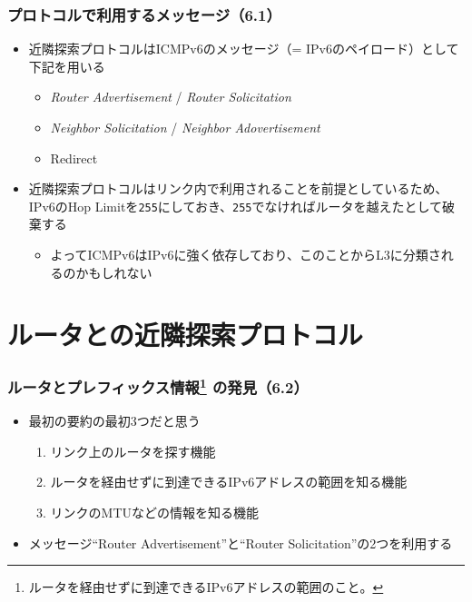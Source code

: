 \begin{frame}
  \frametitle{プロトコルで利用するメッセージ（6.1）}

  \begin{itemize}
    \item 近隣探索プロトコルはICMPv6のメッセージ（= IPv6のペイロード）として下記を用いる
    \begin{itemize}
      \item \emph{Router Advertisement} / \emph{Router Solicitation}
      \item \emph{Neighbor Solicitation} / \emph{Neighbor Adovertisement}
      \item Redirect
    \end{itemize}

    \item 近隣探索プロトコルはリンク内で利用されることを前提としているため、
    IPv6のHop Limitを\texttt{255}にしておき、\texttt{255}でなければルータを越えたとして破棄する
    \begin{itemize}
      \item よってICMPv6はIPv6に強く依存しており、このことからL3に分類されるのかもしれない
    \end{itemize}
  \end{itemize}
\end{frame}

\section{ルータとの近隣探索プロトコル}

\begin{frame}
  \frametitle{%
    ルータとプレフィックス情報\footnote{ルータを経由せずに到達できるIPv6アドレスの範囲のこと。} の発見（6.2）%
  }

  \begin{itemize}
    \item 最初の要約の最初3つだと思う
    \begin{enumerate}
      \item リンク上のルータを探す機能
      \item ルータを経由せずに到達できるIPv6アドレスの範囲を知る機能
      \item リンクのMTUなどの情報を知る機能
    \end{enumerate}

    \item メッセージ``Router Advertisement''と``Router Solicitation''の2つを利用する
  \end{itemize}
\end{frame}

